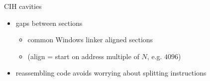 \begin{frame}{CIH cavities}
    \begin{itemize}
    \item gaps between sections
        \begin{itemize}
        \item common Windows linker aligned sections
        \item (align = start on address multiple of $N$, e.g. $4096$)
        \end{itemize}
    \item reassembling code avoids worrying about splitting instructions
    \end{itemize}
\end{frame}

